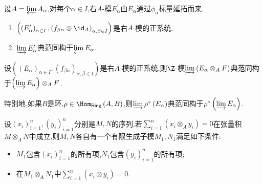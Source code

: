 \begin{corollary}{}{}
	设$A=\varprojlim A_{\alpha}$,对每个$\alpha\in I$,右$A$-模$E_{\alpha}^{\prime}$由$E_{\alpha}$通过$\phi_{\alpha}$标量延拓而来.
	\begin{enumerate}
		\item $\left(\left(E_{\alpha}^{\prime}\right)_{\alpha\in I},\left(f_{\beta\alpha}\otimes\id_{A}\right)_{\alpha,\beta\in I}\right)$是右$A$-模的正系统.
		\item $\varinjlim E_{\alpha}^{\prime}$典范同构于$\varprojlim E_{\alpha}$.
	\end{enumerate}
\end{corollary}

\begin{corollary}{}{}
	设$\left(\left(E_{\alpha}\right)_{\alpha\in I},\left(f_{\beta\alpha}\right)_{\alpha,\beta\in I}\right)$是右$A$-模的正系统,则$\Z$-模$\varinjlim\left(E_{\alpha}\otimes_{A}F\right)$典范同构于$\left(\varinjlim E_{\alpha}\right)\otimes_{A}F$.
\end{corollary}

\begin{remark}{}{}
	特别地,如果$B$是环,$\rho\in\Hom_{\mathsf{Ring}}\left(A,B\right)$,则$\varinjlim\rho^{\ast}\left(E_{\alpha}\right)$典范同构于$\rho^{\ast}\left(\varinjlim E_{\alpha}\right)$.
\end{remark}

\begin{corollary}{}{}
	设$\left(x_{i}\right)_{i=1}^{n},\left(y_{i}\right)_{i=1}^{n}$分别是$M,N$的序列.若$\sum\limits_{i=1}^{n}\left(x_{i}\otimes_{A}y_{i}\right)=0$在张量积$M\otimes_{A}N$中成立,则$M,N$各自有一个有限生成子模$M_{1},N_{1}$满足如下条件:
	\begin{itemize}
		\item $M_{1}$包含$\left(x_{i}\right)_{i=1}^{n}$的所有项,$N_{1}$包含$\left(y_{i}\right)_{i=1}^{n}$的所有项;
		\item 在$M_{1}\otimes_{A}N_{1}$中$\sum\limits_{i=1}^{n}\left(x_{i}\otimes y_{i}\right)=0$.
	\end{itemize}
\end{corollary}















